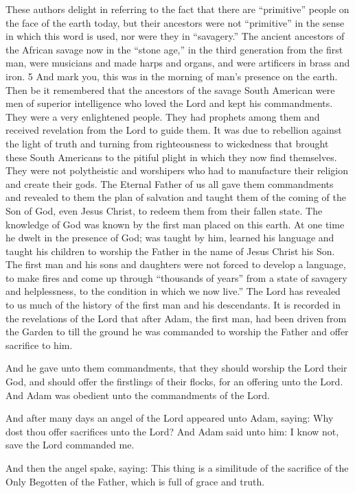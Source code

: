These authors delight in referring to the fact that there are ``primitive'' people on the face of
the earth today, but their ancestors were not ``primitive'' in the sense in which this word is
used, nor were they in ``savagery.'' The ancient ancestors of the African savage now in the
``stone age,'' in the third generation from the first man, were musicians and made harps and
organs, and were artificers in brass and iron. 5 And mark you, this was in the morning of
man's presence on the earth. Then be it remembered that the ancestors of the savage South
American were men of superior intelligence who loved the Lord and kept his
commandments. They were a very enlightened people. They had prophets among them and
received revelation from the Lord to guide them. It was due to rebellion against the light of
truth and turning from righteousness to wickedness that brought these South Americans to
the pitiful plight in which they now find themselves. They were not polytheistic and
worshipers who had to manufacture their religion and create their gods. The Eternal Father of
us all gave them commandments and revealed to them the plan of salvation and taught them
of the coming of the Son of God, even Jesus Christ, to redeem them from their fallen state.
The knowledge of God was known by the first man placed on this earth. At one time he
dwelt in the presence of God; was taught by him, learned his language and taught his
children to worship the Father in the name of Jesus Christ his Son. The first man and his sons
and daughters were not forced to develop a language, to make fires and come up through
``thousands of years'' from a state of savagery and helplessness, to the condition in which we
now live.'' The Lord has revealed to us much of the history of the first man and his
descendants. It is recorded in the revelations of the Lord that after Adam, the first man, had
been driven from the Garden to till the ground he was commanded to worship the Father and
offer sacrifice to him.

And he gave unto them commandments, that they should worship the Lord their God, and
should offer the firstlings of their flocks, for an offering unto the Lord. And Adam was
obedient unto the commandments of the Lord.

And after many days an angel of the Lord appeared unto Adam, saying: Why dost thou offer
sacrifices unto the Lord? And Adam said unto him: I know not, save the Lord commanded
me.

And then the angel spake, saying: This thing is a similitude of the sacrifice of the Only
Begotten of the Father, which is full of grace and truth.

